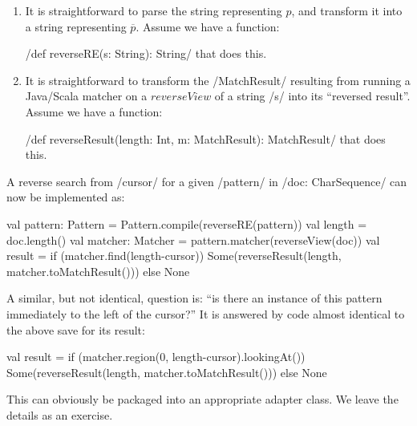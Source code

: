 \documentclass{ip3}
\begin{document}
\begin{note}
\begin{enumerate}
        \item It is straightforward to parse the string representing $p$, and 
        transform it into a string representing $\overbar{p}$. Assume we have
        a function: 
        
        \sc/def reverseRE(s: String): String/ that does this.
        
        \item It is straightforward to transform the \sc/MatchResult/ resulting
        from running a Java/Scala matcher on a $reverseView$ of a string \sc/s/
        into its ``reversed result''. Assume we have a function: 
        
        \sc/def reverseResult(length: Int, m: MatchResult): MatchResult/         
        that does this.           
\end{enumerate}

A reverse search from \sc/cursor/ for a given \sc/pattern/ in \sc/doc: CharSequence/ 
can now be implemented as:
\begin{--scala}
        val pattern: Pattern = Pattern.compile(reverseRE(pattern))
        val length           = doc.length()
        val matcher: Matcher = pattern.matcher(reverseView(doc))
        val result = if (matcher.find(length-cursor)) 
                        Some(reverseResult(length, matcher.toMatchResult()))
                     else 
                        None         
\end{--scala}

A similar, but not identical, question is: ``is there an instance of this
pattern immediately to the left of the cursor?'' It is answered by code almost identical
to the above save for its result:
\begin{--scala}
        val result = if (matcher.region(0, length-cursor).lookingAt()) 
                        Some(reverseResult(length, matcher.toMatchResult()))
                     else 
                        None         
 
\end{--scala}

This can obviously be packaged into an appropriate adapter class. We leave the 
details as an exercise.
\end{note}

\begin{code*}[Patterns.scala]
 } // Patterns
\end{code*}

\end{document}
